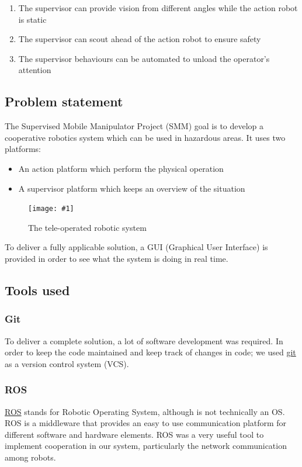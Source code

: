 \documentclass[11pt,a4paper]{article}
\newcommand{\centerFigure}[2]{
\begin{figure}[ht]	
\centering
\texttt{[image: \#1]}
\caption{#2}
\end{figure}
}
\begin{document}
\begin{enumerate}
\item The supervisor can provide vision from different angles while the action robot is static
\item The supervisor can scout ahead of the action robot to ensure safety
\item The supervisor behaviours can be automated to unload the operator's attention
\end{enumerate}


\subsection{Problem statement}
The Supervised Mobile Manipulator Project (SMM) goal is to develop a cooperative robotics
system which can be used in hazardous areas. It uses two platforms: 

\begin{itemize}
\item An action platform which perform the physical operation
\item A supervisor platform which keeps an overview of the situation
\end{itemize}

\centerFigure{teleopSystem.png}{The tele-operated robotic system}

To deliver a fully applicable solution, a GUI (Graphical User Interface) is provided in
order to see what the system is doing in real time.


\subsection{Tools used}
\subsubsection{Git}
To deliver a complete solution, a lot of software development was required. In order to keep
the code maintained and keep track of changes in code; we used \href{https://git-scm.com/}{git} as a version control system
 (VCS).

\subsubsection{ROS}
\href{http://www.ros.org}{ROS} stands for Robotic Operating System, although is not technically an OS. ROS is a middleware that provides an easy to use communication platform for different software and hardware elements. ROS was a very useful tool to implement cooperation in our system, particularly the network communication among robots.
\end{document}
